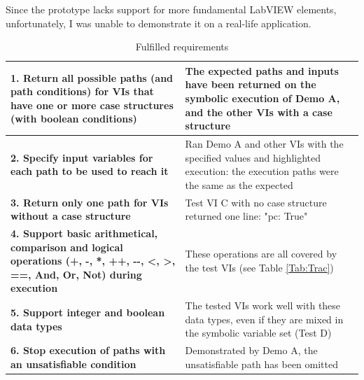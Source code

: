 Since the prototype lacks support for more fundamental LabVIEW elements, unfortunately, I was unable to demonstrate it on a real-life application.

\begin{table}[ht]
\centering
\begin{tabularx}{\linewidth}{XX}
\toprule
\textbf{1. Return all possible paths (and path conditions) for VIs that have one or more case structures (with boolean conditions)}                         & The expected paths and inputs have been returned on the symbolic execution of Demo A, and the other VIs with a case structure                                           \\ \midrule
\textbf{2. Specify input variables for each path to be used to reach it}                                                                                    & Ran Demo A and other VIs with the specified values and highlighted execution: the execution paths were the same as the expected                                         \\ \midrule
\textbf{3. Return only one path for VIs without a case structure}                                                                                           & Test VI C with no case structure returned one line: "pc: True"                                                                                           \\ \midrule
\textbf{4. Support basic arithmetical, comparison and logical operations (+, -, *, ++, -{}-, \textless{}, \textgreater{}, ==, And, Or, Not) during execution} & These operations are all covered by the test VIs (see Table \ref{Tab:Trac}) \\ \midrule
\textbf{5. Support integer and boolean data types}                                                                                                          & The tested VIs work well with these data types, even if they are mixed in the symbolic variable set (Test D)                                                            \\ \midrule
\textbf{6. Stop execution of paths with an unsatisfiable condition}                                                                                         & Demonstrated by Demo A, the unsatisfiable path has been omitted                                                                                                         \\ \bottomrule
\end{tabularx}

\caption{Fulfilled requirements}
  \label{Tab:Requ}
\end{table}



